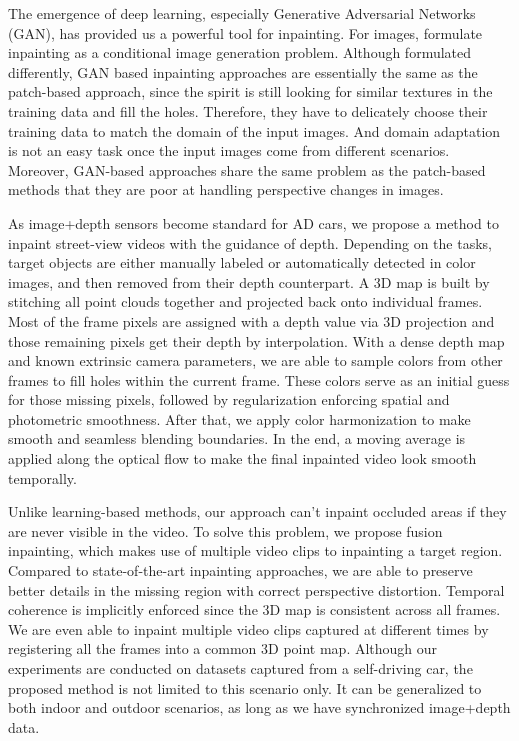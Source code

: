 \documentclass[runningheads]{llncs}
\begin{document}
The emergence of deep learning, especially Generative Adversarial Networks (GAN), has provided us a powerful tool for inpainting. For images, \cite{IizukaSIGGRAPH2017, pathakCVPR16context, yu2018generative} formulate inpainting as
a conditional image generation problem. Although formulated differently, GAN based inpainting approaches are essentially the same as the patch-based approach, since the spirit is still looking for similar textures in the training data and fill the holes. Therefore, they have to delicately choose their training data to match the domain of the input images. And domain adaptation is not an easy task once the input images come from different scenarios. Moreover, GAN-based approaches share the same problem as the patch-based methods that they are poor at handling perspective changes in images.

As image+depth sensors become standard for AD cars, we propose a method to inpaint street-view videos with the guidance of depth. Depending on the tasks, target objects are either manually labeled or automatically detected in color images, and then removed from their depth counterpart. A 3D map is built by stitching all point clouds together and projected back onto individual frames. Most of the frame pixels are assigned with a depth value via 3D projection and those remaining pixels get their depth by interpolation. With a dense depth map and known extrinsic camera parameters, we are able to sample colors from other frames to fill holes within the current frame.  These colors serve as an initial guess for those missing pixels, followed by regularization enforcing spatial and photometric smoothness. After that, we apply color harmonization to make smooth and seamless blending boundaries. In the end, a moving average is applied along the optical flow to make the final inpainted video look smooth temporally.   

Unlike learning-based methods, our approach can’t inpaint occluded areas if they are never visible in the video. To solve this problem, we propose fusion inpainting, which makes use of multiple video clips to inpainting a target region. Compared to state-of-the-art inpainting approaches, we are able to preserve better details in the missing region with correct perspective distortion. Temporal coherence is implicitly enforced since the 3D map is consistent across all frames. We are even able to inpaint multiple video clips captured at different times by registering all the frames into a common 3D point map. Although our experiments are conducted on datasets captured from a self-driving car, the proposed method is not limited to this scenario only. It can be generalized to both indoor and outdoor scenarios, as long as we have synchronized image+depth data.
\end{document}
